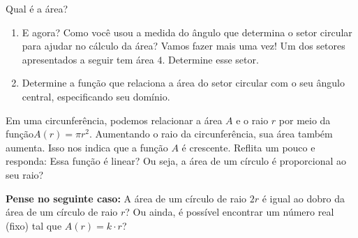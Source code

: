 \begin{task}{Qual é a área?}
\begin{enumerate}
\item{}
E agora? Como você usou a medida do ângulo que determina o setor circular para ajudar no cálculo da área? Vamos fazer mais uma vez! Um dos setores apresentados a seguir tem área \(4\). Determine esse setor.

\begin{figure}[H]
\centering


 \quad\quad\quad
      \quad\quad\quad
\end{figure}

\item{}
Determine a função que relaciona a área do setor circular com o seu ângulo central, especificando seu domínio.

\end{enumerate}
\end{task}

\begin{reflection}

Em uma circunferência, podemos relacionar a área \(A\) e o raio \(r\) por meio da função\linebreak \(A(r)=\pi r^2\). Aumentando o raio da circunferência, sua área também aumenta. Isso nos indica que a função \(A\) é crescente. Reflita um pouco e responda: Essa função é linear? Ou seja, a área de um círculo é proporcional ao seu raio?

\textbf{Pense no seguinte caso:} A área de um círculo de raio \(2r\) é igual ao dobro da área de um círculo de raio \(r\)? Ou ainda, é possível encontrar um número real (fixo) tal que \(A(r)=k\cdot r\)?


\begin{figure}[H]
\centering


\end{figure}
\end{reflection}

